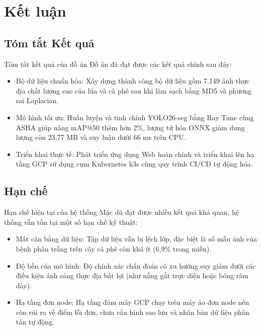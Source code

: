 \section{Kết luận}

\subsection{Tóm tắt Kết quả}
\begin{frame}{Tóm tắt kết quả của đồ án}
  \justifying
  Đồ án đã đạt được các kết quả chính sau đây:
  \vspace{0.3cm}
  \begin{itemize}
    \setlength{\itemsep}{8pt}
    \item[-] Bộ dữ liệu chuẩn hóa: Xây dựng thành công bộ dữ liệu gồm 7.149 ảnh thực địa chất lượng cao của lúa và cà phê sau khi làm sạch bằng MD5 và phương sai Laplacian.
    \item[-] Mô hình tối ưu: Huấn luyện và tinh chỉnh YOLO26-seg bằng Ray Tune cùng ASHA giúp nâng mAP@50 thêm hơn 2\%, lượng tử hóa ONNX giảm dung lượng còn 23,77 MB và suy luận dưới 66 ms trên CPU.
    \item[-] Triển khai thực tế: Phát triển ứng dụng Web hoàn chỉnh và triển khai lên hạ tầng GCP sử dụng cụm Kubernetes k3s cùng quy trình CI/CD tự động hóa.
  \end{itemize}
\end{frame}

\subsection{Hạn chế}
\begin{frame}{Hạn chế hiện tại của hệ thống}
  \justifying
  Mặc dù đạt được nhiều kết quả khả quan, hệ thống vẫn tồn tại một số hạn chế kỹ thuật:
  \vspace{0.3cm}
  \begin{itemize}
    \setlength{\itemsep}{8pt}
    \item[-] Mất cân bằng dữ liệu: Tập dữ liệu vẫn bị lệch lớp, đặc biệt là số mẫu ảnh của bệnh phấn trắng trên cây cà phê còn khá ít (6,9\% trong miền).
    \item[-] Độ bền của mô hình: Độ chính xác chẩn đoán có xu hướng suy giảm dưới các điều kiện ánh sáng thực địa bất lợi (như nắng gắt trực diện hoặc bóng râm dày).
    \item[-] Hạ tầng đơn node: Hạ tầng đám mây GCP chạy trên máy ảo đơn node nên còn rủi ro về điểm lỗi đơn, chưa cấu hình sao lưu và nhân bản dữ liệu phân tán tự động.
  \end{itemize}
\end{frame}

